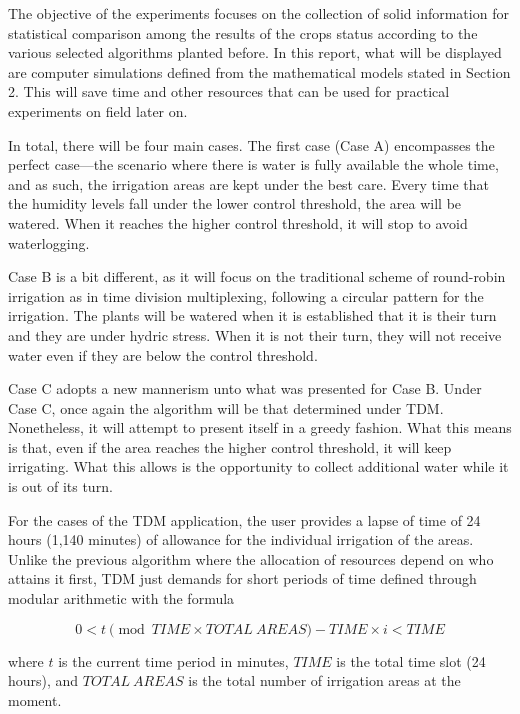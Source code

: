 \documentclass[12pt]{article}
\begin{document}
The objective of the experiments focuses on the collection of solid information for statistical comparison among the results of the crops status according to the various selected algorithms planted before. In this report, what will be displayed are computer simulations defined from the mathematical models stated in Section 2. This will save time and other resources that can be used for practical experiments on field later on.

In total, there will be four main cases. The first case (Case A) encompasses the perfect case—the scenario where there is water is fully available the whole time, and as such, the irrigation areas are kept under the best care. Every time that the humidity levels fall under the lower control threshold, the area will be watered. When it reaches the higher control threshold, it will stop to avoid waterlogging.

Case B is a bit different, as it will focus on the traditional scheme of round-robin irrigation as in time division multiplexing, following a circular pattern for the irrigation. The plants will be watered when it is established that it is their turn and they are under hydric stress. When it is not their turn, they will not receive water even if they are below the control threshold.

Case C adopts a new mannerism unto what was presented for Case B. Under Case C, once again the algorithm will be that determined under TDM. Nonetheless, it will attempt to present itself in a greedy fashion. What this means is that, even if the area reaches the higher control threshold, it will keep irrigating. What this allows is the opportunity to collect additional water while it is out of its turn. 

For the cases of the TDM application, the user provides a lapse of time of 24 hours (1,140 minutes) of allowance for the individual irrigation of the areas. Unlike the previous algorithm where the allocation of resources depend on who attains it first, TDM just demands for short periods of time defined through modular arithmetic with the formula

\begin{equation}
\label{eqn:11}
0 < t \pmod{TIME \times TOTAL\:AREAS} - TIME \times i < TIME
\end{equation}

where $t$ is the current time period in minutes, $TIME$ is the total time slot (24 hours), and $TOTAL\:AREAS$ is the total number of irrigation areas at the moment.
\end{document}
